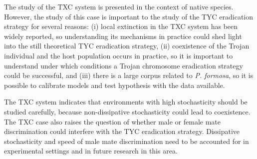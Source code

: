 	The study of the TXC system is presented in the context of native species. However, the study of this case is important to the study of the TYC eradication strategy for several reasons: (i) local extinction in the TXC system has been widely reported, so understanding its mechanisms in practice could shed light into the still theoretical TYC eradication strategy, (ii) coexistence of the Trojan individual and the host population occurs in practice, so it is important to understand under which conditions a Trojan chromosome eradication strategy could be successful, and (iii) there is a large corpus related to \textit{P. formosa}, so it is possible to calibrate models and test hypothesis with the data available. 
	
	The TXC system indicates that environments with high stochasticity should be studied carefully, because non-dissipative stochasticity could lead to coexistence. 
	The TXC case also raises the question of whether male or female mate discrimination could interfere with the TYC eradication strategy. Dissipative stochasticity and speed of male mate discrimination need to be accounted for in experimental settings and in future research in this area. 
	
	
